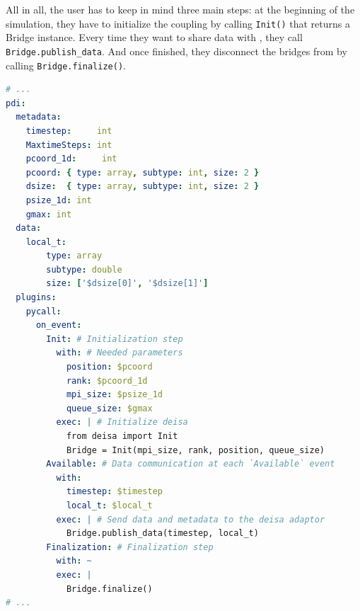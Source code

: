 All in all, the user has to keep in mind three main steps: at the beginning of the simulation, they have to initialize the coupling by calling \texttt{Init()} that returns a Bridge instance. Every time they want to share data with \dask, they call \texttt{Bridge.publish\_data}. And once finished, they disconnect the bridges from \dask by calling \texttt{Bridge.finalize()}.

\begin{lstlisting}[escapeinside={\#}, float=h!, label=list:ymldeisa, language=yaml, caption= Deisa configuration file]
# ...
pdi:
  metadata:
    timestep:     int
    MaxtimeSteps: int 
    pcoord_1d:     int
    pcoord: { type: array, subtype: int, size: 2 }
    dsize:  { type: array, subtype: int, size: 2 }
    psize_1d: int 
    gmax: int 
  data:
    local_t: 
        type: array
        subtype: double
        size: ['$dsize[0]', '$dsize[1]']
  plugins:
    pycall:
      on_event:
        Init: # Initialization step
          with: # Needed parameters
            position: $pcoord
            rank: $pcoord_1d
            mpi_size: $psize_1d
            queue_size: $gmax
          exec: | # Initialize deisa
            from deisa import Init
            Bridge = Init(mpi_size, rank, position, queue_size)
        Available: # Data communication at each `Available` event
          with: 
            timestep: $timestep
            local_t: $local_t
          exec: | # Send data and metadata to the deisa adaptor 
            Bridge.publish_data(timestep, local_t) 
        Finalization: # Finalization step
          with: ~
          exec: | 
            Bridge.finalize()
# ...
\end{lstlisting}


